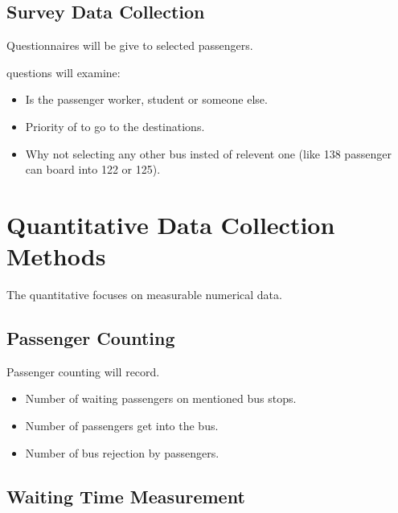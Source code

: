\documentclass[12pt,a4paper]{report}
\begin{document}
\subsection{Survey Data Collection}

Questionnaires will be give to selected passengers.

questions will examine:

\begin{itemize}[noitemsep]

\item Is the passenger worker, student or someone else.
\item Priority of to go to the destinations.
\item Why not selecting any other bus insted of relevent one (like 138 passenger can board into 122 or 125).


\end{itemize}


\section{Quantitative Data Collection Methods}

The quantitative focuses on measurable numerical data.


\subsection{Passenger Counting}

Passenger counting will record.

\begin{itemize}[noitemsep]

\item Number of waiting passengers on mentioned bus stops.
\item Number of passengers get into the bus.
\item Number of bus rejection by passengers.

\end{itemize}


\subsection{Waiting Time Measurement}
\end{document}
